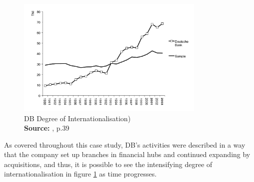 \documentclass[11pt,a4paper]{article}
\newcommand*{\captionsource}[2]{%
  \caption[{#1}]{%
    #1%
    \\\hspace{\linewidth}%
    \textbf{Source:} #2%
  }%
}
\begin{document}
{{  \vspace{5mm}
\begin{figure}[H]
	\centering
  \includegraphics[width=90mm]{figures/fig_db_internationalisation}
  \vspace{5mm}
    \captionsetup{justification=centering,margin=2cm}
      \captionsource{DB Degree of Internationalisation)}{\cite{slagerInternationalizationBanksStrategic2005}, p.39}
	\label{fig:db_international}
\end{figure}

As covered throughout this case study, DB's activities were described in a way that the company set up branches in financial hubs and continued expanding by acquisitions, and thus, it is possible to see the intensifying degree of internationalisation in figure \ref{fig:db_international} as time progresses.


}}
\end{document}
